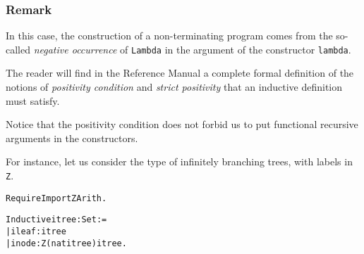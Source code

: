 \documentclass[11pt]{article}
\begin{document}
\subsubsection*{Remark} In this case, the construction of a non-terminating
program comes from the so-called \textsl{negative occurrence} of
\texttt{Lambda} in the argument of the constructor \texttt{lambda}. 

The reader will find in the Reference Manual a complete formal 
definition of the notions of \emph{positivity condition} and
\emph{strict positivity} that an inductive definition must satisfy.






Notice that the positivity condition does not forbid us to
put  functional recursive
arguments in the constructors. 

For instance, let us consider the type of infinitely branching trees,
with labels in \texttt{Z}.
\begin{alltt}
Require Import ZArith.

Inductive itree : Set :=
| ileaf : itree
| inode : Z {\arrow} (nat {\arrow} itree) {\arrow} itree.
\end{alltt}
\end{document}

